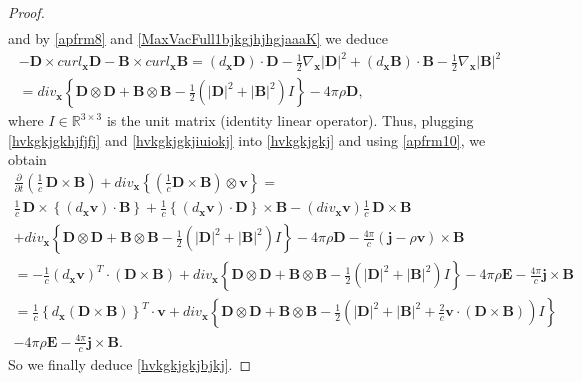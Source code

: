 \documentclass{article}
\theoremstyle{definition}
\theoremstyle{remark}
\renewcommand{\vec}[1]{\mathbf{#1}}
\newcommand{\R}{\mathbb{R}}
\newcommand{\er}{\eqref}
\newcommand{\R}{{\mathbb{R}}}
\newcommand{\er}{\eqref}
\begin{document}
\begin{proof}
\begin{multline}
\end{multline}
and by \er{apfrm8} and \er{MaxVacFull1bjkgjhjhgjaaaK} we deduce
\begin{multline}\label{hvkgkjgkjiuiokj}
-\vec D\times curl_\vec x \vec D-\vec B\times curl_\vec x \vec
B=(d_\vec x \vec D)\cdot \vec D-\frac{1}{2}\nabla_\vec x |\vec
D|^2+(d_\vec x \vec B)\cdot \vec B-\frac{1}{2}\nabla_\vec x |\vec
B|^2\\=div_\vec x\left\{\vec D\otimes \vec D+\vec B\otimes \vec
B-\frac{1}{2}\left(|\vec D|^2+|\vec B|^2\right)I\right\}-4\pi\rho
\vec D,
\end{multline}
where $I\in\R^{3\times 3}$ is the unit matrix (identity linear
operator). Thus, plugging \er{hvkgkjgkhjfjfj} and
\er{hvkgkjgkjiuiokj} into \er{hvkgkjgkj} and using \er{apfrm10}, we
obtain
\begin{multline}\label{hvkgkjgkjbjkjghiooiyiokk}
\frac{\partial}{\partial t}\left(\frac{1}{c}\,\vec D\times \vec
B\right)+div_\vec x\left\{\left(\frac{1}{c}\vec D\times \vec
B\right)\otimes \vec v\right\}=\\ \frac{1}{c}\,\vec
D\times\left\{(d_\vec x \vec v)\cdot \vec
B\right\}+\frac{1}{c}\left\{(d_\vec x \vec v)\cdot \vec
D\right\}\times \vec B-(div_\vec x \vec v)\frac{1}{c}\,\vec D\times
\vec B
\\+div_\vec x\left\{\vec D\otimes \vec D+\vec B\otimes
\vec B-\frac{1}{2}\left(|\vec D|^2+|\vec
B|^2\right)I\right\}-4\pi\rho \vec D-\frac{4\pi}{c}(\vec j-\rho \vec
v)\times \vec B\\=-\frac{1}{c}(d_\vec x \vec v)^T\cdot(\vec D\times
\vec B)+div_\vec x\left\{\vec D\otimes \vec D+\vec B\otimes \vec
B-\frac{1}{2}\left(|\vec D|^2+|\vec B|^2\right)I\right\}-4\pi\rho
\vec E-\frac{4\pi}{c}\vec j\times \vec B
\\ =\frac{1}{c}\left\{d_\vec x(\vec D\times \vec B)\right\}^T\cdot \vec v+div_\vec x\left\{\vec D\otimes \vec D+\vec B\otimes
\vec B-\frac{1}{2}\left(|\vec D|^2+|\vec B|^2+\frac{2}{c}\vec
v\cdot(\vec D\times \vec B)\right)I\right\}\\-4\pi\rho \vec
E-\frac{4\pi}{c}\vec j\times \vec B.
\end{multline}
So we finally deduce \er{hvkgkjgkjbjkj}.
\end{proof}
\end{document}
